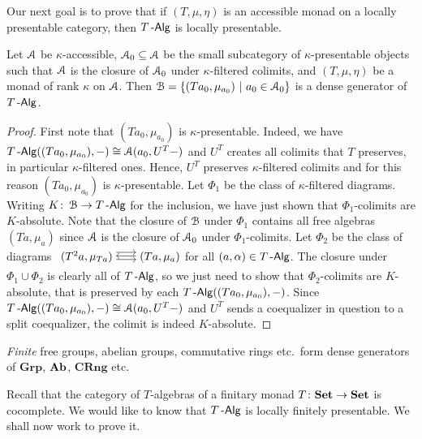 \documentclass[a4paper,11pt,oneside,openany]{scrbook}
\begin{document}
Our next goal is to prove that if $(T,\mu,\eta)$ is an accessible monad on a
locally presentable category, then $T\operatorname{-\mathsf{Alg}}$ is locally presentable.
\begin{prop}
	Let $\operatorname{\mathcal{A}}$ be $\kappa$-accessible, $\operatorname{\mathcal{A}}_0\subseteq\operatorname{\mathcal{A}}$ be the small subcategory
    of $\kappa$-presentable objects such that $\operatorname{\mathcal{A}}$ is the closure of $\operatorname{\mathcal{A}}_0$
    under $\kappa$-filtered colimits, and $(T,\mu,\eta)$ be a monad of rank
    $\kappa$ on $\operatorname{\mathcal{A}}$. Then $\operatorname{\mathcal{B}}=\{ (Ta_0,\mu_{a_0})\ | \ a_0\in\operatorname{\mathcal{A}}_0 \}$ is a
    dense generator of $T\operatorname{-\mathsf{Alg}}$.
\end{prop}
\begin{proof}
	First note that $(Ta_0,\mu_{a_0})$ is $\kappa$-presentable. Indeed, we have
    $T\operatorname{-\mathsf{Alg}}((Ta_0,\mu_{a_0}),-)\cong\operatorname{\mathcal{A}}(a_0,U^T-)$ and $U^T$ creates all colimits
    that $T$ preserves, in particular $\kappa$-filtered ones. Hence, $U^T$
    preserves $\kappa$-filtered colimits and for this reason $(Ta_0,\mu_{a_0})$
    is $\kappa$-presentable. Let $\Phi_1$  be the class of $\kappa$-filtered
    diagrams. Writing $K\colon\operatorname{\mathcal{B}}\to T\operatorname{-\mathsf{Alg}}$ for the inclusion, we have just shown
    that $\Phi_1$-colimits are $K$-absolute. Note that the closure of $\operatorname{\mathcal{B}}$ under
    $\Phi_1$ contains all free algebras $(Ta,\mu_a)$ since $\operatorname{\mathcal{A}}$ is the closure
    of $\operatorname{\mathcal{A}}_0$ under $\Phi_1$-colimits. Let $\Phi_2$ be the class of diagrams
    $\begin{tikzcd}
	    (T^2a,\mu_{Ta})\hspace{-1.5mm}\arrow[r, shift right=.5ex, shorten <= .3em, shorten >= .3em] \arrow[r, shift left=1ex, shorten <= .3em, shorten >= .3em] & \hspace{-1.5mm}(Ta,\mu_a)\arrow[l, shift right=.25ex, shorten <=.3em, shorten >=.3em]
		\end{tikzcd}\hspace{-1.5mm}$ for all $(a,\alpha)\in T\operatorname{-\mathsf{Alg}}$. The closure
        under $\Phi_1\cup\Phi_2$ is clearly all of $T\operatorname{-\mathsf{Alg}}$, so we just need to
        show that $\Phi_2$-colimits are $K$-absolute, that is preserved by each
        $T\operatorname{-\mathsf{Alg}}((Ta_0,\mu_{a_0}),-)$. Since
        $T\operatorname{-\mathsf{Alg}}((Ta_0,\mu_{a_0}),-)\cong\operatorname{\mathcal{A}}(a_0, U^T-)$ and $U^T$ sends a
        coequalizer in question to a split coequalizer, the colimit is indeed
        $K$-absolute.
\end{proof}
\begin{exmp}
	\emph{Finite} free groups, abelian groups, commutative rings etc.\ form
    dense generators of $\mathbf{Grp}$, ${\normalfont\textbf{Ab}}$, $\mathbf{CRng}$ etc.
\end{exmp}
Recall that the category of $T$-algebras of a finitary monad
$T\colon{\normalfont\textbf{Set}}\to{\normalfont\textbf{Set}}$ is cocomplete. We would like to know that $T\operatorname{-\mathsf{Alg}}$ is
locally finitely presentable. We shall now work to prove it.
\end{document}
